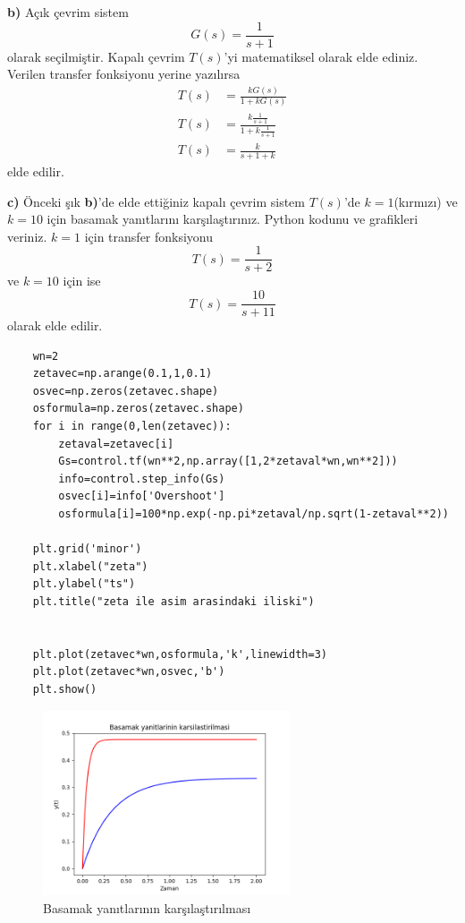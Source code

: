 \noindent\textbf{b)} Açık çevrim sistem
\begin{equation}
	G(s)=\frac{1}{s+1}
\end{equation}
olarak seçilmiştir. Kapalı çevrim $T(s)$'yi matematiksel olarak elde ediniz.
Verilen transfer fonksiyonu yerine yazılırsa
\begin{equation}
    \begin{split}
        T(s)&=\frac{kG(s)}{1+k G(s)}\\
        T(s)&=\frac{k\frac{1}{s+1}}{1+k \frac{1}{s+1}}\\
        T(s)&=\frac{k}{s+1+k}
    \end{split}
\end{equation}
elde edilir.

\noindent\textbf{c)} Önceki şık \noindent\textbf{b)}'de elde ettiğiniz kapalı çevrim sistem $T(s)$'de $k=1$(kırmızı) ve $k=10$ için basamak yanıtlarını karşılaştırınız. Python kodunu ve grafikleri veriniz.
$k=1$ için transfer fonksiyonu
\begin{equation}
    T(s)=\frac{1}{s+2}
\end{equation}
ve $k=10$ için ise 
\begin{equation}
    T(s)=\frac{10}{s+11}
\end{equation}
olarak elde edilir. 
\clearpage
\begin{lstlisting}
    wn=2
    zetavec=np.arange(0.1,1,0.1)
    osvec=np.zeros(zetavec.shape)
    osformula=np.zeros(zetavec.shape)
    for i in range(0,len(zetavec)):
        zetaval=zetavec[i]
        Gs=control.tf(wn**2,np.array([1,2*zetaval*wn,wn**2]))
        info=control.step_info(Gs)
        osvec[i]=info['Overshoot']
        osformula[i]=100*np.exp(-np.pi*zetaval/np.sqrt(1-zetaval**2))

    plt.grid('minor')
    plt.xlabel("zeta")
    plt.ylabel("ts")
    plt.title("zeta ile asim arasindaki iliski")


    plt.plot(zetavec*wn,osformula,'k',linewidth=3)
    plt.plot(zetavec*wn,osvec,'b')
    plt.show()
    \end{lstlisting}


    \begin{figure}[!htb]
        \centering
        \includegraphics[width=0.65\textwidth]{response}
        \caption{Basamak yanıtlarının karşılaştırılması}
    \end{figure}